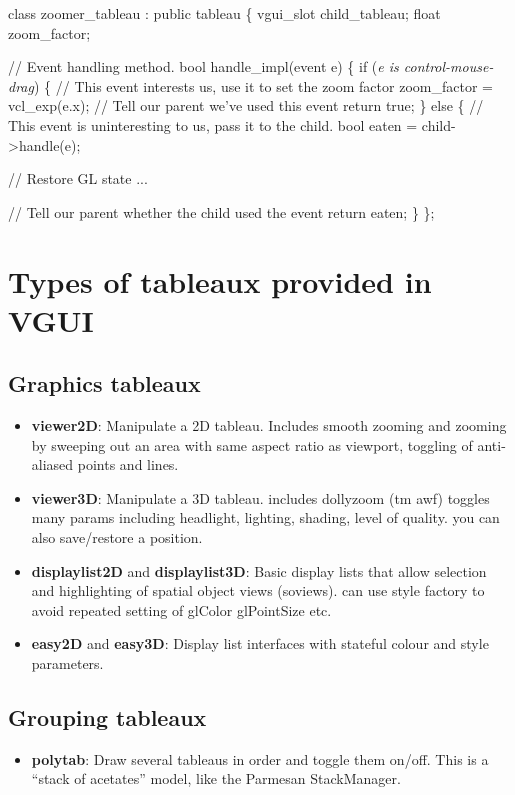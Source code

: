 \documentclass[12pt]{report} \usepackage{epsfig}
\begin{document}
{\scriptsize \begin{verbawf}
  class zoomer\_tableau : public tableau
  \{
    vgui_slot child_tableau;
    float zoom\_factor;

    // Event handling method.
    bool handle\_impl(event e)
    \{
      if ({\em e is control-mouse-drag})
      \{
        //  This event interests us, use it to set the zoom factor
        zoom\_factor = vcl_exp(e.x);
        //  Tell our parent we've used this event
        return true;
      \}
      else
      \{
        //  This event is uninteresting to us, pass it to the child.
        bool eaten = child->handle(e);

        //  Restore GL state
        ...

        //  Tell our parent whether the child used the event
        return eaten;
      \}
  \};
\end{verbawf}}


\section{Types of tableaux provided in VGUI}

\subsection{Graphics tableaux}
\begin{itemize}
\item {\bf viewer2D}:  Manipulate a 2D tableau. Includes smooth zooming and zooming by
            sweeping out an area with same aspect ratio as viewport,
            toggling of anti-aliased points and lines.
\item {\bf viewer3D}: Manipulate a 3D tableau. includes dollyzoom (tm awf) toggles
            many params including headlight, lighting, shading, level of
            quality. you can also save/restore a position.
\item {\bf displaylist2D} and {\bf displaylist3D}: Basic display lists that allow selection
      and highlighting of spatial object views (soviews). can use style factory to avoid
      repeated setting of glColor glPointSize etc.
\item {\bf easy2D} and {\bf easy3D}: Display list interfaces with stateful colour and style
      parameters.
\end{itemize}

\subsection{Grouping tableaux}
\begin{itemize}
\item {\bf polytab}: Draw several tableaus in order and toggle them on/off.  This is
      a ``stack of acetates'' model, like the Parmesan StackManager.
\end{itemize}
\end{document}

